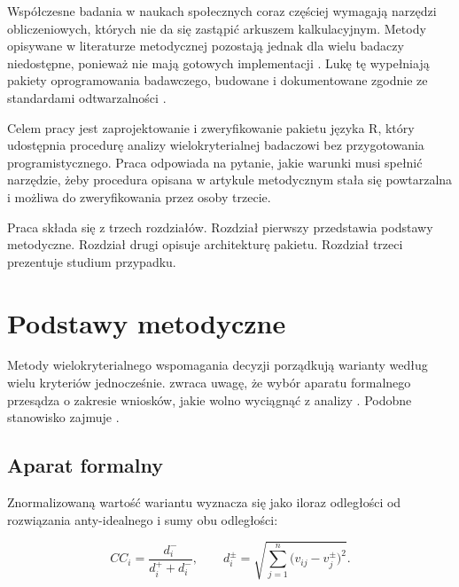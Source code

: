 \documentclass[stronyinfo]{epi-praca}
\begin{document}
\stronatytulowa
\stronyinformacyjne

\tableofcontents

\wprowadzenie

Współczesne badania w naukach społecznych coraz częściej wymagają narzędzi obliczeniowych, których nie da się zastąpić arkuszem kalkulacyjnym. Metody opisywane w literaturze metodycznej pozostają jednak dla wielu badaczy niedostępne, ponieważ nie mają gotowych implementacji \parencite{cisek2002filozoficzne}. Lukę tę wypełniają pakiety oprogramowania badawczego, budowane i dokumentowane zgodnie ze standardami odtwarzalności \parencite[s.~15-21]{kowalski2010a}.

Celem pracy jest zaprojektowanie i zweryfikowanie pakietu języka R, który udostępnia procedurę analizy wielokryterialnej badaczowi bez przygotowania programistycznego. Praca odpowiada na pytanie, jakie warunki musi spełnić narzędzie, żeby procedura opisana w artykule metodycznym stała się powtarzalna i możliwa do zweryfikowania przez osoby trzecie.

Praca składa się z trzech rozdziałów. Rozdział pierwszy przedstawia podstawy metodyczne. Rozdział drugi opisuje architekturę pakietu. Rozdział trzeci prezentuje studium przypadku.

\chapter{Podstawy metodyczne}

Metody wielokryterialnego wspomagania decyzji porządkują warianty według wielu kryteriów jednocześnie.  zwraca uwagę, że wybór aparatu formalnego przesądza o zakresie wniosków, jakie wolno wyciągnąć z analizy \parencite{hjorland1998theory}. Podobne stanowisko zajmuje \textcite{wozniak1997kognitywizm}.

\section{Aparat formalny}

Znormalizowaną wartość wariantu wyznacza się jako iloraz odległości od rozwiązania anty-idealnego i sumy obu odległości:

\begin{equation}\label{eq:cc}
  CC_i = \frac{d_i^{-}}{d_i^{+} + d_i^{-}},
  \qquad
  d_i^{\pm} = \sqrt{\sum_{j=1}^{n} \bigl(v_{ij} - v_j^{\pm}\bigr)^2}.
\end{equation}
\end{document}
